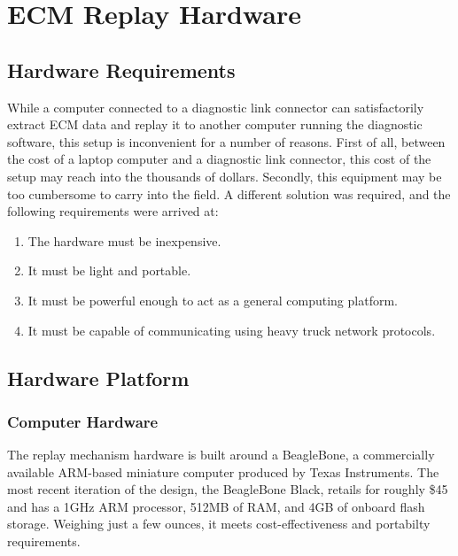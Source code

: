 \chapter{ECM Replay Hardware}


\section{Hardware Requirements}

While a computer connected to a diagnostic link connector can satisfactorily extract ECM data and replay
it to another computer running the diagnostic software, this setup is inconvenient for a number of reasons.
First of all, between the cost of a laptop computer and a diagnostic link connector, this cost of the setup
may reach into the thousands of dollars. Secondly, this equipment may be too cumbersome to carry into the field.
A different solution was required, and the following requirements were arrived at:

\begin{enumerate}
  \item The hardware must be inexpensive.
  \item It must be light and portable.
  \item It must be powerful enough to act as a general computing platform.
  \item It must be capable of communicating using heavy truck network protocols.
\end{enumerate}

\section{Hardware Platform}

\subsection{Computer Hardware}

The replay mechanism hardware is built around a BeagleBone, a commercially available ARM-based miniature computer produced
by Texas Instruments. The most recent iteration of the design, the BeagleBone Black, retails for roughly \$45 and has a 1GHz ARM
processor, 512MB of RAM, and 4GB of onboard flash storage. Weighing just a few ounces, it meets cost-effectiveness and portabilty
requirements.


